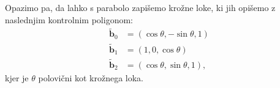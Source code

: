 \documentclass[a4paper,11pt]{article}
\theoremstyle{definition}
\theoremstyle{plain}
\begin{document}
\noindent
Opazimo pa, da lahko s parabolo zapišemo krožne loke, ki jih opišemo z naslednjim kontrolnim poligonom:
\begin{align*}
\boldsymbol{\tilde{b}}_0 &= (\cos{\theta}, -\sin{\theta}, 1)\\
\boldsymbol{\tilde{b}}_1 &= (1, 0, \cos{\theta})\\
\boldsymbol{\tilde{b}}_2 &= (\cos \theta, \sin\theta, 1),
\end{align*}
kjer je $\theta$ polovični kot krožnega loka. 

\end{document}
